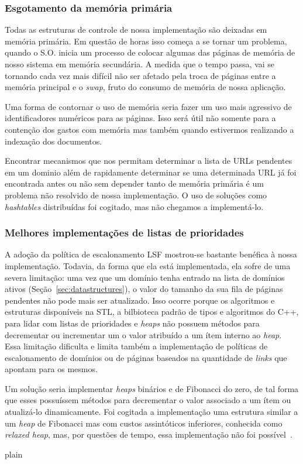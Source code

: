 \documentclass[10pt,twocolumn]{article}
\begin{document}
\subsubsection{Esgotamento da memória primária}

Todas as estruturas de controle de nossa implementação são deixadas em
memória primária. Em questão de horas isso começa a se tornar um
problema, quando o S.O. inicia um processo de colocar algumas das
páginas de memória de nosso sistema em  memória secundária. A medida que
o tempo passa, vai se tornando cada vez mais difícil não ser afetado
pela troca de páginas entre a memória principal e o \emph{swap}, fruto
do consumo de memória de nossa aplicação.

Uma forma de contornar o uso de memória seria fazer um uso mais
agressivo de identificadores numéricos para as páginas. Isso será útil
não somente para a contenção dos gastos com memória mas também quando
estivermos realizando a indexação dos documentos.

Encontrar mecanismos que nos permitam determinar a lista de URLs
pendentes em um dominio além de rapidamente determinar se uma
determinada URL já foi encontrada antes ou não sem depender tanto de
memória primária é um problema não resolvido de nossa implementação.
O uso de soluções como \emph{hashtables} distribuídas foi cogitado, mas
não chegamos a implementá-lo.

\subsubsection{Melhores implementações de listas de prioridades}

A adoção da política de escalonamento LSF mostrou-se bastante benéfica à
nossa implementação. Todavia, da forma que ela está implementada, ela
sofre de uma severa limitação: uma vez que um domínio tenha entrado na
lista de domínios ativos (Seção~\ref{sec:datastructures}), o valor do
tamanho da sua fila de páginas pendentes não pode mais ser atualizado.
Isso ocorre porque os algoritmos e estruturas disponíveis na STL, a
bilbioteca padrão de tipos e algoritmos do C++, para lidar com listas de
prioridades e \emph{heaps} não possuem métodos para decrementar ou
incrementar um o valor atribuído a um ítem interno ao \emph{heap}. Essa
limitação dificulta e limita também a implementação de políticas de
escalonamento de domínios ou de páginas baseados na quantidade de
\emph{links} que apontam para os mesmos.

Um solução seria implementar \emph{heaps} binários e de Fibonacci do
zero, de tal forma que esses possuíssem métodos para decrementar o valor
associado a um ítem ou atualizá-lo dinamicamente. Foi cogitada a
implementação uma estrutura similar a um \emph{heap} de Fibonacci mas
com custos assintóticos inferiores, conhecida como \emph{relaxed heap},
mas, por questões de tempo, essa implementação não foi
possível~\cite{driscoll1988relaxed}.


 {plain}

\end{document}
